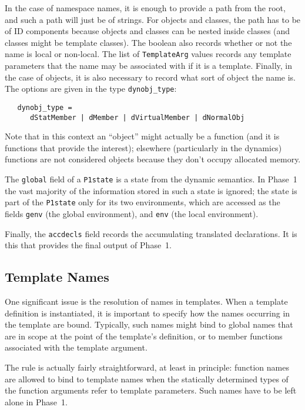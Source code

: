 \documentclass[11pt]{article}
\begin{document}
In the case of namespace names, it is enough to provide a path from
the root, and such a path will just be of strings.  For objects and
classes, the path has to be of ID components because objects and
classes can be nested inside classes (and classes might be template
classes).  The boolean also records whether or not the name is local
or non-local.  The list of \texttt{TemplateArg} values records any
template parameters that the name may be associated with if it is a
template.  Finally, in the case of objects, it is also necessary to
record what sort of object the name is.  The options are given in the
type \texttt{dynobj_type}:
\begin{verbatim}
   dynobj_type =
      dStatMember | dMember | dVirtualMember | dNormalObj
\end{verbatim}
Note that in this context an ``object'' might actually be a function
(and it is functions that provide the interest); elsewhere
(particularly in the dynamics) functions are not considered objects
because they don't occupy allocated memory.

The \texttt{global} field of a \texttt{P1state} is a state from the
dynamic semantics.  In Phase~1 the vast majority of the information
stored in such a state is ignored; the state is part of the
\texttt{P1state} only for its two environments, which are accessed as
the fields \texttt{genv} (the global environment), and \texttt{env}
(the local environment).
%
%

Finally, the \texttt{accdecls} field records the accumulating
translated declarations.  It is this that provides the final output of
Phase~1.

\subsection{Template Names}
\label{sec:p1-template-names}

One significant issue is the resolution of names in templates.  When a
template definition is instantiated, it is important to specify how
the names occurring in the template are bound.  Typically, such names
might bind to global names that are in scope at the point of the
template's definition, or to member functions associated with the
template argument.

The rule is actually fairly straightforward, at least in principle:
function names are allowed to bind to template names when the
statically determined types of the function arguments refer to
template parameters.  Such names have to be left alone in Phase~1.
\end{document}
